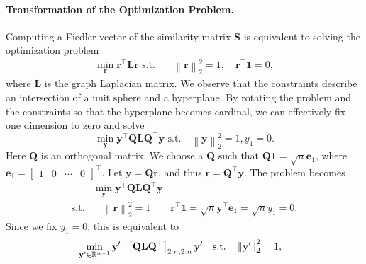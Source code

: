 \documentclass[nohyperref]{article}
\theoremstyle{plain}
\theoremstyle{definition}
\theoremstyle{remark}
\begin{document}
\paragraph{Transformation of the Optimization Problem.}Computing a Fiedler vector of the similarity matrix $\mathbf{S}$
is equivalent to solving the optimization problem \cite{von2007tutorial}
\vspace{-1mm} 
\begin{align}
\label{eq:problem_original}
\min_\mathbf{r} \mathbf{r}^\top \mathbf{L} \mathbf{r} 
\text{ s.t.} &\quad \left\lVert \mathbf{r} \right\rVert_2^2 = 1, \quad \mathbf{r}^\top \mathbf{1} = 0, 
\end{align} 
\noindent  where $\mathbf{L}$ is the graph Laplacian matrix.
We observe that the constraints describe an intersection of a unit sphere and a hyperplane.  By rotating the problem and the constraints so that the hyperplane becomes cardinal, we can effectively fix one dimension to zero and solve
\vspace{-1mm}
\begin{equation}
   \min_\mathbf{y} \mathbf{y}^\top
   \mathbf{Q} \mathbf{L} \mathbf{Q}^\top 
   \mathbf{y} 
\text{ s.t.} \quad \left\lVert \mathbf{y} \right\rVert_2^2 = 1, y_1=0. 
\end{equation}
Here $\mathbf{Q}$ is an orthogonal matrix. 
We choose a
$\mathbf{Q}$ such that $\mathbf{Q} \mathbf{1} = \sqrt{n} \mathbf{e}_1$, where $\mathbf{e}_1 = \begin{bmatrix} 1 & 0 & \cdots & 0 \end{bmatrix}^\top$.
Let $\mathbf{y} = \mathbf{Q} \mathbf{r}$, and thus $\mathbf{r} = \mathbf{Q}^\top \mathbf{y}$. The problem  becomes
\vspace{-1mm}
\begin{align*}
&\min_\mathbf{y} \mathbf{y}^\top \mathbf{Q} \mathbf{L} \mathbf{Q}^\top \mathbf{y} \\
\text{s.t.} &\quad
\left\lVert \mathbf{r} \right\rVert_2^2=1
\qquad  \mathbf{r}^\top \mathbf{1}  
= \sqrt{n} \mathbf{y}^\top \mathbf{e}_1 = \sqrt{n} y_1 = 0. 
\end{align*}
Since we fix $y_1 = 0$, this is equivalent to
\begin{align}
\vspace{-3mm}
\label{eq:problem_reduced}
&\min_{\mathbf{y}' \in \mathbb{R}^{n-1}} \mathbf{y}'^\top \left[ \mathbf{Q} \mathbf{L} \mathbf{Q}^\top\right]_{2:n,2:n} \mathbf{y}' \quad 
\text{s.t.} \quad \left\lVert \mathbf{y}' \right\rVert_2^2 = 1,  
\end{align}
\end{document}
